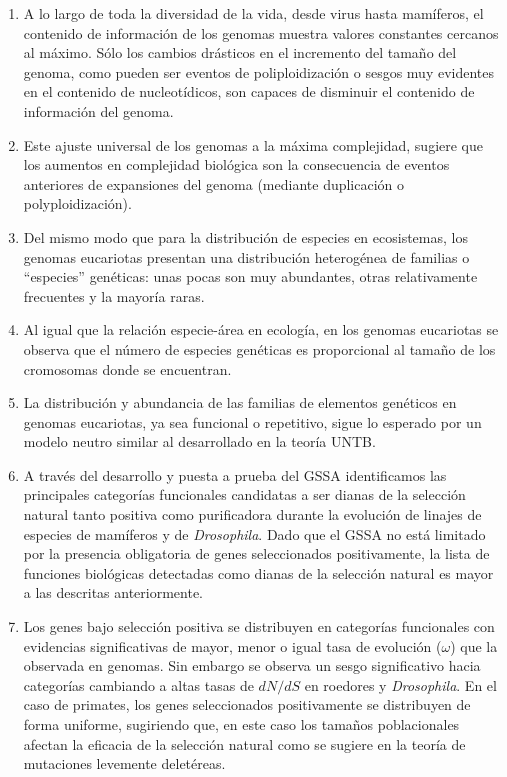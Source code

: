 \begin{enumerate}
\item A lo largo de toda la diversidad de la vida, desde virus hasta mamíferos, el contenido de información de los genomas muestra valores constantes cercanos al máximo. Sólo los cambios drásticos en el incremento del tamaño del genoma, como pueden ser eventos de poliploidización o sesgos muy evidentes en el contenido de nucleotídicos, son capaces de disminuir el contenido de información del genoma.
\item Este ajuste universal de los genomas a la máxima complejidad, sugiere que los aumentos en complejidad biológica son la consecuencia de eventos anteriores de expansiones del genoma (mediante duplicación o polyploidización).
\item Del mismo modo que para la distribución de especies en ecosistemas, los genomas eucariotas presentan una distribución heterogénea de familias o ``especies'' genéticas: unas pocas son muy abundantes, otras relativamente frecuentes y la mayoría raras.
\item Al igual que la relación especie-área en ecología, en los genomas eucariotas se observa que el número de especies genéticas es proporcional al tamaño de los cromosomas donde se encuentran.
\item La distribución y abundancia de las familias de elementos genéticos en genomas eucariotas, ya sea funcional o repetitivo, sigue lo esperado por un modelo neutro similar al desarrollado en la teoría UNTB.
\item A través del desarrollo y puesta a prueba del GSSA identificamos las principales categorías funcionales candidatas a ser dianas de la selección natural tanto positiva como purificadora durante la evolución de linajes de especies de mamíferos y de \textit{Drosophila}. Dado que el GSSA no está limitado por la presencia obligatoria de genes seleccionados positivamente, la lista de funciones biológicas detectadas como dianas de la selección natural es mayor a las descritas anteriormente.
\item Los genes bajo selección positiva se distribuyen en categorías funcionales con evidencias significativas de mayor, menor o igual tasa de evolución ($\omega$) que la observada en genomas. Sin embargo se observa un sesgo significativo hacia categorías cambiando a altas tasas de $dN/dS$ en roedores y \textit{Drosophila}. En el caso de primates, los genes seleccionados positivamente se distribuyen de forma uniforme, sugiriendo que, en este caso los tamaños poblacionales afectan la eficacia de la selección natural como se sugiere en la teoría de mutaciones levemente deletéreas.

\end{enumerate}

